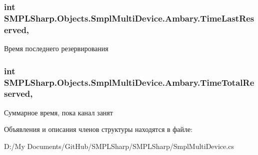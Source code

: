 \hypertarget{struct_s_m_p_l_sharp_1_1_objects_1_1_smpl_multi_device_1_1_ambary_af51ba6a3079bd09a71f4cc797beb9e6a}{
\subsubsection[{Time\-Last\-Reserved}]{\setlength{\rightskip}{0pt plus 5cm}int S\-M\-P\-L\-Sharp.\-Objects.\-Smpl\-Multi\-Device.\-Ambary.\-Time\-Last\-Reserved\hspace{0.3cm}{\ttfamily [get]}, {\ttfamily [set]}}}\label{d1/df4/struct_s_m_p_l_sharp_1_1_objects_1_1_smpl_multi_device_1_1_ambary_af51ba6a3079bd09a71f4cc797beb9e6a}


Время последнего резервирования 

\hypertarget{struct_s_m_p_l_sharp_1_1_objects_1_1_smpl_multi_device_1_1_ambary_a8f8b20fb74105cecd5af51513d5b7826}{
\subsubsection[{Time\-Total\-Reserved}]{\setlength{\rightskip}{0pt plus 5cm}int S\-M\-P\-L\-Sharp.\-Objects.\-Smpl\-Multi\-Device.\-Ambary.\-Time\-Total\-Reserved\hspace{0.3cm}{\ttfamily [get]}, {\ttfamily [set]}}}\label{d1/df4/struct_s_m_p_l_sharp_1_1_objects_1_1_smpl_multi_device_1_1_ambary_a8f8b20fb74105cecd5af51513d5b7826}


Суммарное время, пока канал занят 



Объявления и описания членов структуры находятся в файле\-:\begin{DoxyCompactItemize}
\item 
D\-:/\-My Documents/\-Git\-Hub/\-S\-M\-P\-L\-Sharp/\-S\-M\-P\-L\-Sharp/Smpl\-Multi\-Device.\-cs\end{DoxyCompactItemize}
